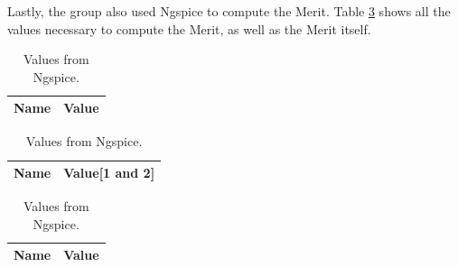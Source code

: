 Lastly, the group also used Ngspice to compute the Merit. Table \ref{tab:merit} shows all the 
values necessary to compute the Merit, as well as the Merit itself.

\begin{table}[h]
	\centering
	\begin{tabular}{|l|r|}
		\hline    
		{\bf Name} & {\bf Value} \\ \hline
    		
	\end{tabular}
	
	\caption{Values from Ngspice.}
    
\label{tab:op_sim}
\end{table}

\begin{table}[h]
	\centering
	\begin{tabular}{|l|r|}
		\hline    
		{\bf Name} & {\bf Value[1 and 2]} \\ \hline
    		
    		
	\end{tabular}
	
	\caption{Values from Ngspice.}
    
\label{tab:imp_sim}
\end{table}

\begin{table}[h]
	\centering
	\begin{tabular}{|l|r|}
		\hline    
		{\bf Name} & {\bf Value} \\ \hline
    		
	\end{tabular}
	
	\caption{Values from Ngspice.}
    
\label{tab:merit}
\end{table}


